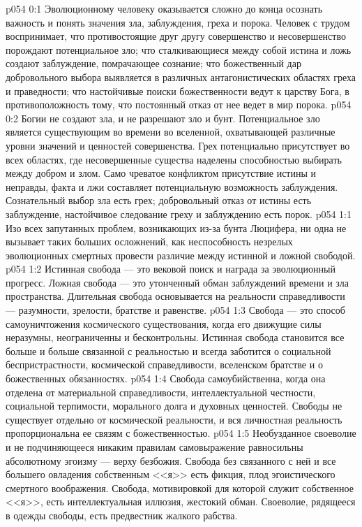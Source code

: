 \vs p054 0:1 Эволюционному человеку оказывается сложно до конца осознать важность и понять значения зла, заблуждения, греха и порока. Человек с трудом воспринимает, что противостоящие друг другу совершенство и несовершенство порождают потенциальное зло; что сталкивающиеся между собой истина и ложь создают заблуждение, помрачающее сознание; что божественный дар добровольного выбора выявляется в различных антагонистических областях греха и праведности; что настойчивые поиски божественности ведут к царству Бога, в противоположность тому, что постоянный отказ от нее ведет в мир порока.
\vs p054 0:2 Богии не создают зла, и не разрешают зло и бунт. Потенциальное зло является существующим во времени во вселенной, охватывающей различные уровни значений и ценностей совершенства. Грех потенциально присутствует во всех областях, где несовершенные существа наделены способностью выбирать между добром и злом. Само чреватое конфликтом присутствие истины и неправды, факта и лжи составляет потенциальную возможность заблуждения. Сознательный выбор зла есть грех; добровольный отказ от истины есть заблуждение, настойчивое следование греху и заблуждению есть порок.
\vs p054 1:1 Изо всех запутанных проблем, возникающих из\hyp{}за бунта Люцифера, ни одна не вызывает таких больших осложнений, как неспособность незрелых эволюционных смертных провести различие между истинной и ложной свободой.
\vs p054 1:2 Истинная свобода --- это вековой поиск и награда за эволюционный прогресс. Ложная свобода --- это утонченный обман заблуждений времени и зла пространства. Длительная свобода основывается на реальности справедливости --- разумности, зрелости, братстве и равенстве.
\vs p054 1:3 Свобода --- это способ самоуничтожения космического существования, когда его движущие силы неразумны, неограниченны и бесконтрольны. Истинная свобода становится все больше и больше связанной с реальностью и всегда заботится о социальной беспристрастности, космической справедливости, вселенском братстве и о божественных обязанностях.
\vs p054 1:4 Свобода самоубийственна, когда она отделена от материальной справедливости, интеллектуальной честности, социальной терпимости, морального долга и духовных ценностей. Свободы не существует отдельно от космической реальности, и вся личностная реальность пропорциональна ее связям с божественностью.
\vs p054 1:5 Необузданное своеволие и не подчиняющееся никаким правилам самовыражение равносильны абсолютному эгоизму --- верху безбожия. Свобода без связанного с ней и все большего овладения собственным <<я>> есть фикция, плод эгоистического смертного воображения. Свобода, мотивировкой для которой служит собственное <<я>>, есть интеллектуальная иллюзия, жестокий обман. Своеволие, рядящееся в одежды свободы, есть предвестник жалкого рабства.
